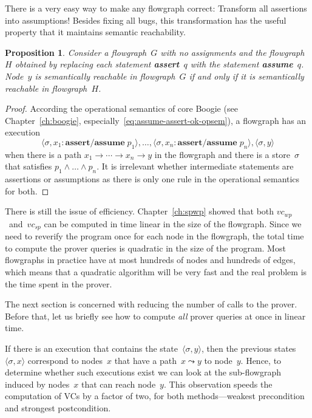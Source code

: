 \documentclass[a4paper]{article}
\theoremstyle{slanted}
\newtheorem{proposition}{Proposition}
\theoremstyle{definition}
\theoremstyle{remark}
\begin{document}
There is a very easy way to make any flowgraph correct: Transform
all assertions into assumptions! Besides fixing all bugs, this
transformation has the useful property that it maintains semantic
reachability.

\begin{proposition}
Consider a flowgraph~$G$ with no assignments and the
flowgraph~$H$ obtained by replacing each statement
\textbf{assert}~$q$ with the statement \textbf{assume}~$q$.
Node~$y$ is semantically reachable in flowgraph~$G$ if and only
if it is semantically reachable in flowgraph~$H$.
\end{proposition}

\begin{proof}
According the operational semantics of core Boogie 
(see Chapter~\ref{ch:boogie},
especially~\eqref{eq:assume-assert-ok-opsem}),
a flowgraph has an execution \[
  \langle\sigma,x_1:\mathbf{assert}/\mathbf{assume}\;p_1\rangle,\ldots,
  \langle\sigma,x_n:\mathbf{assert}/\mathbf{assume}\;p_n\rangle,
  \langle\sigma,y\rangle
\] when there is a path $x_1\to\cdots\to x_n\to y$ in the
flowgraph and there is a store~$\sigma$ that satisfies 
$p_1\land\ldots\land p_n$. It is irrelevant whether 
intermediate statements are assertions or assumptions
as there is only one rule in the operational semantics
for both.
\end{proof}

There is still the issue of efficiency.
Chapter~\ref{ch:spwp} showed that both
$\mathit{vc}_\mathit{wp}$~and~$\mathit{vc}_\mathit{sp}$ can be
computed in time linear in the size of the flowgraph. Since we
need to reverify the program once for each node in the flowgraph,
the total time to compute the prover queries is quadratic in
the size of the program. Most flowgraphs in practice have at
most hundreds of nodes and hundreds of edges, which means that a
quadratic algorithm will be very fast and the real problem is the
time spent in the prover.

The next section is concerned with reducing the number of calls
to the prover. Before that, let us briefly see how to compute
\emph{all} prover queries at once in linear time.

If there is an execution that contains the
state~$\langle\sigma,y\rangle$, then the previous
states~$\langle\sigma,x\rangle$ correspond to nodes~$x$ that have
a path~$x\leadsto y$ to node~$y$. Hence, to determine whether
such executions exist we can look at the sub-flowgraph induced by
nodes~$x$ that can reach node~$y$. This observation speeds the
computation of VCs by a factor of two, for both methods---weakest
precondition and strongest postcondition.
\end{document}
